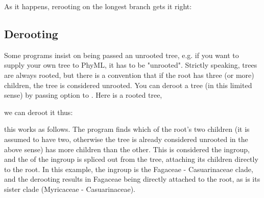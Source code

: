 As it happens, rerooting on the longest branch gets it right:

\startalignment[center]
\stopalignment






\subsection{Derooting}

Some programs insist on being passed an unrooted tree, e.g. if you want to
supply your own tree to PhyML, it has to be "unrooted". Strictly speaking,
\nw{} trees are always rooted, but there is a convention that if the root has
three (or more) children, the tree is considered unrooted. You can deroot a
tree (in this limited sense) by passing option  to \reroot{}. Here
is a rooted tree, 

\startalignment[center]
\stopalignment

we can deroot it thus:

\startalignment[center]
\stopalignment

this works as follows. The program finds which of the root's two
children (it is assumed to have two, otherwise the tree is already considered
unrooted in the above sense) has more children than the other. This is
considered the ingroup, and the \lca{} of the ingroup is spliced out from the
tree, attaching its children directly to the root. In this example, the ingroup
is the Fagaceae - Casuarinaceae clade, and the derooting results in Fagaceae
being directly attached to the root, as is its sister clade (Myricaceae -
Casuarinaceae).
